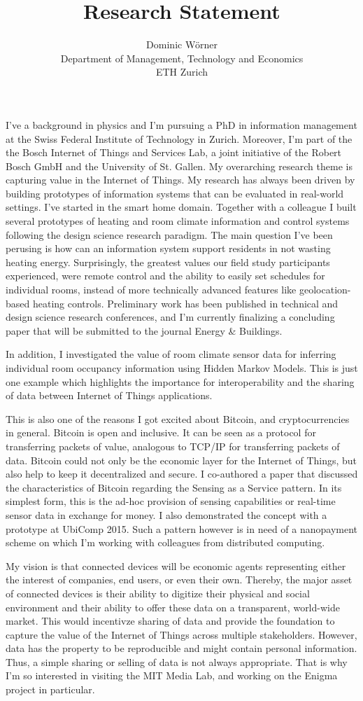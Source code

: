 \documentclass[a4paper, 12pt]{scrartcl}
\title{Research Statement}
\author{Dominic W\"orner \\ Department of Management, Technology and Economics \\ ETH Zurich}
\begin{document}
\maketitle

I've a background in physics and I'm pursuing a PhD in information management at the Swiss Federal Institute of Technology in Zurich. Moreover, I'm part of the the Bosch Internet of Things and Services Lab, a joint initiative of the Robert Bosch GmbH and the University of St. Gallen. My overarching research theme is capturing value in the Internet of Things. My research has always been driven by building prototypes of information systems that can be evaluated in real-world settings. I've started in the smart home domain. Together with a colleague I built several prototypes of heating and room climate information and control systems following the design science research paradigm. The main question I've been perusing is how can an information system support residents in not wasting heating energy.
Surprisingly, the greatest values our field study participants experienced, were remote control and the ability to easily set schedules for individual rooms, instead of more technically advanced features like geolocation-based heating controls. Preliminary work has been published in technical and design science research conferences, and I'm currently finalizing a concluding paper that will be submitted to the journal Energy \& Buildings.

In addition, I investigated the value of room climate sensor data for inferring individual room occupancy information using Hidden Markov Models. This is just one example which highlights the importance for interoperability and the sharing of data between Internet of Things applications.

This is also one of the reasons I got excited about Bitcoin, and cryptocurrencies in general. Bitcoin is open and inclusive. It can be seen as a protocol for transferring packets of value, analogous to TCP/IP for transferring packets of data. Bitcoin could not only be the economic layer for the Internet of Things, but also help to keep it decentralized and secure. I co-authored a paper that discussed the characteristics of Bitcoin regarding the Sensing as a Service pattern. In its simplest form, this is the ad-hoc provision of sensing capabilities or real-time sensor data in exchange for money. I also demonstrated the concept with a prototype at UbiComp 2015. Such a pattern however is in need of a nanopayment scheme on which I'm working with colleagues from distributed computing.

My vision is that connected devices will be economic agents representing either the interest of companies, end users, or even their own. Thereby, the major asset of connected devices is their ability to digitize their physical and social environment and their ability to offer these data on a transparent, world-wide market. This would incentivze sharing of data and provide the foundation to capture the value of the Internet of Things across multiple stakeholders. However, data has the property to be reproducible and might contain personal information. Thus, a simple sharing or selling of data is not always appropriate. That is why I'm so interested in visiting the MIT Media Lab, and working on the Enigma project in particular. 
\end{document}
